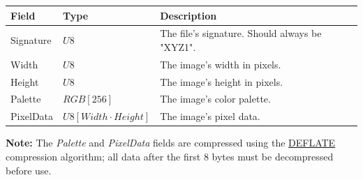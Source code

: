 \documentclass{article}
\begin{document}
\begin{table}[h!]
\centering
\begin{tabular}{|l|l|l|}
\hline
\textbf{Field} & \textbf{Type}             & \textbf{Description}                           \\ \hline
Signature      & $U8$                      & The file's signature. Should always be "XYZ1". \\ \hline
Width          & $U8$                      & The image's width in pixels.                   \\ \hline
Height         & $U8$                      & The image's height in pixels.                  \\ \hline
Palette        & $RGB[256]$                & The image's color palette.                     \\ \hline
PixelData      & $U8[Width \cdot Height]$ & The image's pixel data.                        \\ \hline
\end{tabular}
\end{table}

\textbf{Note:} The \textit{Palette} and \textit{PixelData} fields are compressed using the \href{https://en.wikipedia.org/wiki/DEFLATE}{DEFLATE} compression algorithm; all data after the first 8 bytes must be decompressed before use.
\end{document}
